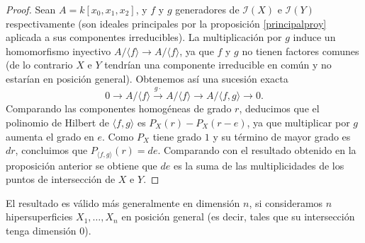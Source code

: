 \documentclass[a4paper,10pt]{book}
\newcommand{\II}{{\mathcal I}}
\begin{document}
\begin{proof}
 Sean $A=k[x_0,x_1,x_2]$, y $f$ y $g$ generadores de $\II(X)$ e $\II(Y)$ respectivamente (son ideales principales por la proposición \ref{principalproy} aplicada a sus componentes irreducibles). La multiplicación por $g$ induce un homomorfismo inyectivo $A/\langle f\rangle\to A/\langle f\rangle$, ya que $f$ y $g$ no tienen factores comunes (de lo contrario $X$ e $Y$ tendrían una componente irreducible en común y no estarían en posición general). Obtenemos así una sucesión exacta
$$
0\to A/\langle f\rangle\stackrel{g\cdot}{\to} A/\langle f\rangle\to A/\langle f,g\rangle\to 0.
$$
Comparando las componentes homogéneas de grado $r$, deducimos que el polinomio de Hilbert de $\langle f,g\rangle$ es $P_X(r)-P_X(r-e)$, ya que multiplicar por $g$ aumenta el grado en $e$. Como $P_X$ tiene grado $1$ y su término de mayor grado es $dr$, concluimos que $P_{\langle f,g\rangle}(r)=de$. Comparando con el resultado obtenido en la proposición anterior se obtiene que $de$ es la suma de las multiplicidades de los puntos de intersección de $X$ e $Y$. 
\end{proof}

El resultado es válido más generalmente en dimensión $n$, si consideramos $n$ hipersuperficies $X_1,\ldots,X_n$ en posición general (es decir, tales que su intersección tenga dimensión $0$).
\end{document}
